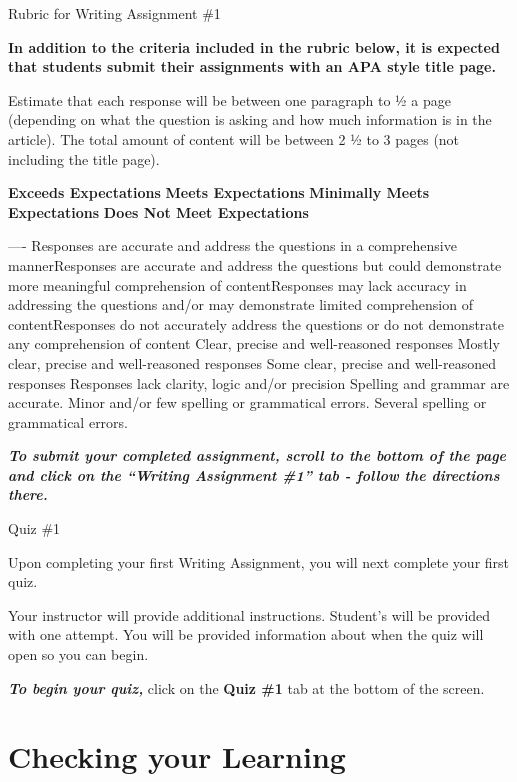 \documentclass[
]{book}
\begin{document}
\begin{assessment}
{Rubric for Writing Assignment \#1}

\textbf{In addition to the criteria included in the rubric below, it is expected that students submit their assignments with an APA style title page.}

Estimate that each response will be between one paragraph to ½ a page (depending on what the question is asking and how much information is in the article). The total amount of content will be between 2 ½ to 3 pages (not including the title page).

\textbf{Exceeds Expectations} \textbar{} \textbf{Meets Expectations} \textbar{} \textbf{Minimally Meets Expectations} \textbar{} \textbf{Does Not Meet Expectations} \textbar{}

\textbar\textbar--\textbar--\textbar-\textbar{}
Responses are accurate and address the questions in a comprehensive manner\textbar Responses are accurate and address the questions but could demonstrate more meaningful comprehension of content\textbar Responses may lack accuracy in addressing the questions and/or may demonstrate limited comprehension of content\textbar Responses do not accurately address the questions or do not demonstrate any comprehension of content\textbar{}
Clear, precise and well-reasoned responses\textbar{} Mostly clear, precise and well-reasoned responses \textbar Some clear, precise and well-reasoned responses \textbar{} Responses lack clarity, logic and/or precision\textbar{}
\textbar Spelling and grammar are accurate.\textbar{} Minor and/or few spelling or grammatical errors.\textbar{} Several spelling or grammatical errors.\textbar{}

\textbf{\emph{To submit your completed assignment, scroll to the bottom of the page and click on the ``Writing Assignment \#1'' tab - follow the directions there.}}

{Quiz \#1}

Upon completing your first Writing Assignment, you will next complete your first quiz.

Your instructor will provide additional instructions. Student's will be provided with one attempt. You will be provided information about when the quiz will open so you can begin.

\textbf{\emph{To begin your quiz,}} click on the \textbf{Quiz \#1} tab at the bottom of the screen.
\end{assessment}

\hypertarget{checking-your-learning-3}{%
\section*{Checking your Learning}\label{checking-your-learning-3}}
\end{document}
